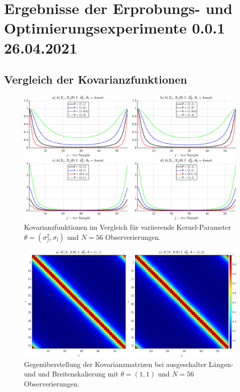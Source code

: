 %

\chapter{Ergebnisse der Erprobungs- und Optimierungsexperimente 0.0.1 26.04.2021}\label{ch:results-exp}


\section{Vergleich der Kovarianzfunktionen}\label{sec:ergexp1}


\begin{figure}[tbph]
	\centering
	\includegraphics[width=\linewidth]{appendix/images/8-Ergebnisse-Experimente/Vergleich-Kovarianzfunktionen}
	\caption[Kovarianzfunktionen im Vergleich]{Kovarianzfunktionen im Vergleich für variierende Kernel-Parameter $\theta = (\sigma_f^2, \sigma_l)$ und $N=56$ Observerierungen.}
	\label{fig:vergleich-kovarianzfunktionen}
\end{figure}



\begin{figure}[tbph]
	\centering
	\includegraphics[width=\linewidth]{appendix/images/8-Ergebnisse-Experimente/Vergleich-Kovarianzmatrizen}
	\caption[Gegenüberstellung der Kovarianzmatrizen]{Gegenüberstellung der Kovarianzmatrizen bei ausgeschalter Längen- und und Breitenskalierung mit $\theta = (1,1)$ und $N=56$ Observerierungen.}
	\label{fig:vergleich-kovarianzmatrizen}
\end{figure}


